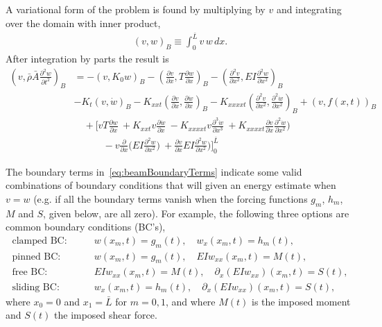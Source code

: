 \documentclass[11pt]{article}
\newcommand{\rhos}{\bar{\rho}}
\newcommand{\As}{\bar{A}}
\newcommand{\Ls}{\bar{L}}
\newcommand{\wt}{\dot{w}}
\begin{document}
A variational form of the problem is found by multiplying by $v$ and integrating over the domain with inner product,
\begin{align}
   (v,w)_B \equiv \int_0^{\Ls} v \, w \, dx. 
\end{align}
After integration by parts the result is 
\begin{align}
 \left( v,  \rhos \As \frac{\partial^2 w}{\partial t^2} \right)_B  &= 
                  - \left( v , K_0 w \right)_B
                  - \left( \frac{\partial v}{\partial x} , T \frac{\partial w}{\partial x} \right)_B
                  -\left(\frac{\partial^2 v}{\partial x^2}, E I \frac{\partial^2 w}{\partial x^2}\right)_B  \\
            & - K_{t} \left( v ,\wt \right)_B
              - K_{xxt} \left( \frac{\partial v}{\partial x} ,\frac{\partial \wt}{\partial x} \right)_B
              - K_{xxxxt} \left( \frac{\partial^2 v}{\partial x^2} ,\frac{\partial^2 \wt}{\partial x^2} \right)_B
             + ( v, f(x,t))_B \\
             &\quad  +   \Big[ v T \frac{\partial w}{\partial x} 
                      ~ + K_{xxt}v  \frac{\partial \wt}{\partial x}
                      ~ -K_{xxxxt} v \frac{\partial^3 \wt}{\partial x^3} 
                      ~ + K_{xxxxt} \frac{\partial v}{\partial x}\frac{\partial^2 \wt}{\partial x^2}\Big)  \\
              &\qquad\quad -v \frac{\partial}{\partial x}\Big( E I \frac{\partial^2 w}{\partial x^2}\Big) 
                      ~ + \frac{\partial v}{\partial x}E I \frac{\partial^2 w}{\partial x^2}\Big)  
                      \Big]_0^{\Ls}   \label{eq:beamBoundaryTerms}
\end{align}

The boundary terms in~\eqref{eq:beamBoundaryTerms} indicate some valid combinations of boundary conditions that will given an energy estimate
when $v=w$ (e.g. if all the boundary terms vanish when the forcing functions $g_m$, $h_m$, $M$ and $S$, given below, are all zero). 
For example, the following three options are common boundary conditions (BC's), 
\begin{align}
   \text{clamped BC:}\quad & \quad w(x_m,t)=g_m(t),\quad  w_x(x_m,t)=h_m(t),  \\
   \text{pinned BC:} \quad & \quad w(x_m,t)=g_m(t), \quad E I w_{xx}(x_m,t)=M(t), \\
   \text{free BC:}   \quad & \quad  E I w_{xx}(x_m,t)=M(t), \quad \partial_x( E I w_{xx})(x_m,t)=S(t), \\
   \text{sliding BC:}   \quad & \quad  w_x(x_m,t)=h_m(t), \quad \partial_x( E I w_{xx})(x_m,t)=S(t),
\end{align}
where $x_0=0$ and $x_1=\Ls$ for $m=0,1$, and 
where $M(t)$ is the imposed moment and $S(t)$ the imposed shear force. 
\end{document}
